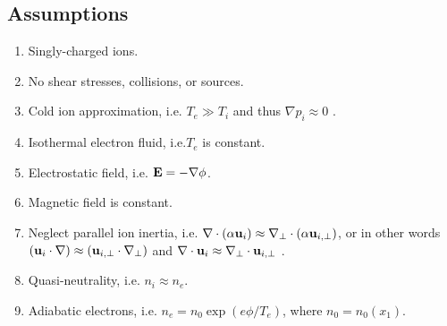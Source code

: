 \documentclass[oneside,a4paper,11pt]{report}
\begin{document}
\subsection{Assumptions}
\begin{enumerate}
    \item Singly-charged ions. \label{it:hm_single_charge_ions}
    \item No shear stresses, collisions, or sources. \label{it:hm_no_shear_source_coll}
    \item Cold ion approximation, i.e. $T_e \gg T_i$ and thus $\nabla p_i \approx 0$ \cite{hasegawa1977}. \label{it:hm_cold}
    \item Isothermal electron fluid, i.e.\@ $T_e$ is constant. \label{it:hm_isothermal_electron}
    \item Electrostatic field, i.e. $\mathbf{E} = - \nabla \phi$. \label{it:hm_electrostatic}
    \item Magnetic field is constant.
    \item Neglect parallel ion inertia, i.e. $\nabla \cdot (\alpha \mathbf{u}_i) \approx \nabla_\perp \cdot (\alpha \mathbf{u}_{i,\perp})$, or in other words $(\mathbf{u}_i \cdot \nabla) \approx (\mathbf{u}_{i,\perp} \cdot \nabla_\perp)$ and $\nabla \cdot \mathbf{u}_i \approx \nabla_\perp \cdot \mathbf{u}_{i,\perp}$ \cite{hasegawa1977}. \label{it:hm_par_ion}
    \item Quasi-neutrality, i.e. $n_i \approx n_e$. \label{it:hm_quasineutrality}
    \item Adiabatic electrons, i.e. $n_e = n_0 \exp (e\phi/T_e)$, where $n_0 = n_0(x_1)$. \label{it:hm_adiabatic}
\end{enumerate}

\end{document}
